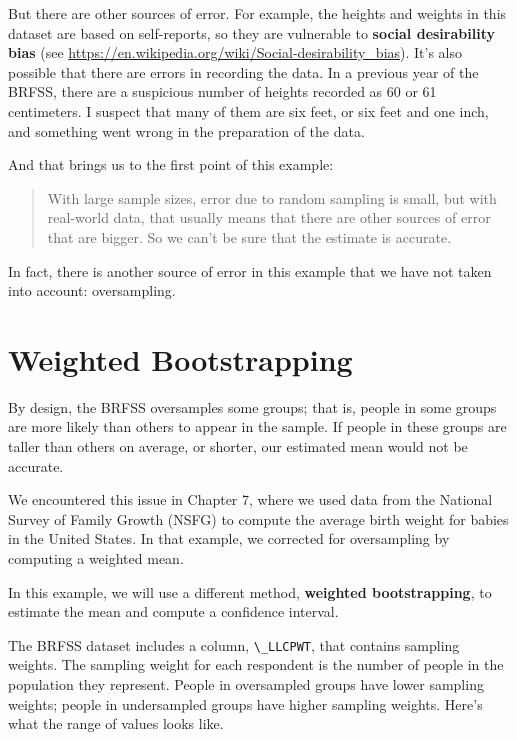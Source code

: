 But there are other sources of error. For example, the heights and
weights in this dataset are based on self-reports, so they are
vulnerable to \textbf{social desirability bias} (see
\url{https://en.wikipedia.org/wiki/Social-desirability_bias}). It's also
possible that there are errors in recording the data. In a previous year
of the BRFSS, there are a suspicious number of heights recorded as 60 or
61 centimeters. I suspect that many of them are six feet, or six feet
and one inch, and something went wrong in the preparation of the data.

And that brings us to the first point of this example:

\begin{quote}
With large sample sizes, error due to random sampling is small, but with
real-world data, that usually means that there are other sources of
error that are bigger. So we can't be sure that the estimate is
accurate.
\end{quote}

In fact, there is another source of error in this example that we have
not taken into account: oversampling.

\hypertarget{weighted-bootstrapping}{%
\section{Weighted Bootstrapping}\label{weighted-bootstrapping}}

By design, the BRFSS oversamples some groups; that is, people in some
groups are more likely than others to appear in the sample. If people in
these groups are taller than others on average, or shorter, our
estimated mean would not be accurate.

We encountered this issue in Chapter 7, where we used data from the
National Survey of Family Growth (NSFG) to compute the average birth
weight for babies in the United States. In that example, we corrected
for oversampling by computing a weighted mean.

In this example, we will use a different method, \textbf{weighted
bootstrapping}, to estimate the mean and compute a confidence interval.

The BRFSS dataset includes a column, \passthrough{\lstinline!\_LLCPWT!},
that contains sampling weights. The sampling weight for each respondent
is the number of people in the population they represent. People in
oversampled groups have lower sampling weights; people in undersampled
groups have higher sampling weights. Here's what the range of values
looks like.

